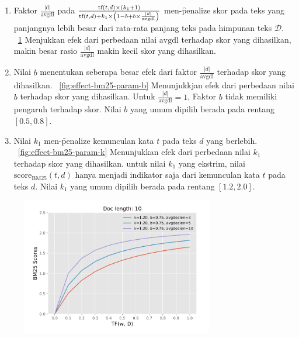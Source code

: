     \begin{enumerate}
        \item Faktor $\frac{|\text{d}|}{\text{avgdl}}$ pada $\frac{\text{tf}(t, d) \times (k_1 + 1)}{\text{tf}(t, d) + k_1 \times \left(1 - b + b \times \textcolor{black}{\frac{|d|}{\text{avgdl}}}\right)}$ men-\f{penalize} skor pada teks yang panjangnya lebih besar dari rata-rata panjang teks pada himpunan teks $\mathcal{D}$. \pic~\ref{fig:effect-bm25-long-doc} Menjukkan efek dari perbedaan nilai $\text{avgdl}$ terhadap skor yang dihasilkan, makin besar rasio $\frac{|d|}{\text{avgdl}}$ makin kecil skor yang dihasilkan.
        \item Nilai $b$ menentukan seberapa besar efek dari faktor $\frac{|d|}{\text{avgdl}}$ terhadap skor yang dihasilkan. \pic~\ref{fig:effect-bm25-param-b} Menunjukkjan efek dari perbedaan nilai $b$ terhadap skor yang dihasilkan. Untuk $\frac{|d|}{\text{avgdl}}=1$, Faktor $b$ tidak memiliki pengaruh terhadap skor. Nilai $b$ yang umum dipilih berada pada rentang $[0.5, 0.8]$.
        \item  Nilai $k_1$ men-\f{penalize} kemunculan kata $t$ pada teks $d$ yang berlebih. \pic~\ref{fig:effect-bm25-param-k} Menunjukkan efek dari perbedaan nilai $k_1$ terhadap skor yang dihasilkan. untuk nilai $k_1$ yang ekstrim, nilai $\text{score}_{\text{BM25}}(t,d)$ hanya menjadi indikator saja dari kemunculan kata $t$ pada teks $d$. Nilai $k_1$ yang umum dipilih berada pada rentang $[1.2, 2.0]$.
    \end{enumerate}
    \begin{figure}
        \centering
        \includegraphics[width=0.75\textwidth]{assets/pics/effect-bm25-long-doc.png}
        \label{fig:effect-bm25-long-doc}
    \end{figure}

